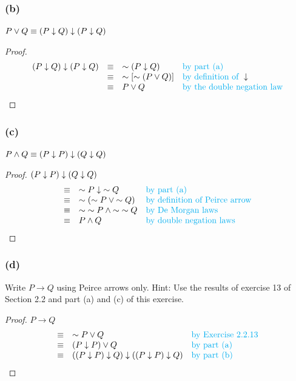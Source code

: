 \documentclass[14pt]{extarticle}
\begin{document}
\subsubsection{(b)} $P \vee Q \equiv (P \downarrow Q) \downarrow (P \downarrow Q)$
\begin{proof} $$ \begin{array}{rcll} (P \downarrow Q) \downarrow (P \downarrow Q) & \equiv & {\sim (P
\downarrow Q)} & \text{\color{cyan}by part (a)} \\ & \equiv & {\sim[{\sim (P \vee Q)}]}
& \text{\color{cyan}by definition of } \downarrow \\ & \equiv & P \vee Q&
\text{\color{cyan}by the double negation law} \\ \end{array} $$ \end{proof}

\subsubsection{(c)} $P \wedge Q \equiv (P \downarrow P) \downarrow (Q \downarrow Q)$
\begin{proof} $(P \downarrow P) \downarrow (Q \downarrow Q)$ $$ \begin{array}{cll} \equiv & {\sim P}
\downarrow {\sim Q} & \text{\color{cyan}by part (a)} \\ \equiv & {\sim ({\sim P} \vee
{\sim Q})} & \text{\color{cyan}by definition of Peirce arrow} \\ \equiv & {\sim
{\sim P}} \wedge {\sim {\sim Q}} & \text{\color{cyan}by De Morgan laws} \\
\equiv & P \wedge Q & \text{\color{cyan}by double negation laws} \\ \end{array}
$$ \end{proof}

\subsubsection{(d)} Write $P \to Q$ using Peirce arrows only.
Hint: Use the results of exercise 13 of Section 2.2 and part (a) and (c) of this
exercise.

\begin{proof} $P \to Q$ $$ \begin{array}{cll} \equiv & {\sim P} \vee Q &
\text{\color{cyan}by Exercise 2.2.13} \\ \equiv & (P \downarrow P) \vee Q &
\text{\color{cyan}by part (a)} \\ \equiv & ((P \downarrow P) \downarrow Q) \downarrow ((P \downarrow P) \downarrow
Q) & \text{\color{cyan}by part (b)} \\ \end{array} $$ \end{proof}
\end{document}
